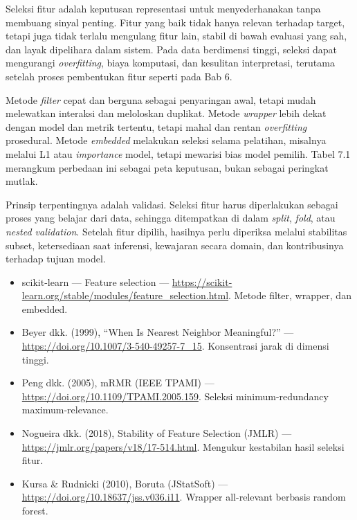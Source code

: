 \begin{sintesis}

Seleksi fitur adalah keputusan representasi untuk menyederhanakan tanpa membuang sinyal penting. Fitur yang baik tidak hanya relevan terhadap target, tetapi juga tidak terlalu mengulang fitur lain, stabil di bawah evaluasi yang sah, dan layak dipelihara dalam sistem. Pada data berdimensi tinggi, seleksi dapat mengurangi \emph{overfitting}, biaya komputasi, dan kesulitan interpretasi, terutama setelah proses pembentukan fitur seperti pada Bab 6.

Metode \emph{filter} cepat dan berguna sebagai penyaringan awal, tetapi mudah melewatkan interaksi dan meloloskan duplikat. Metode \emph{wrapper} lebih dekat dengan model dan metrik tertentu, tetapi mahal dan rentan \emph{overfitting} prosedural. Metode \emph{embedded} melakukan seleksi selama pelatihan, misalnya melalui L1 atau \emph{importance} model, tetapi mewarisi bias model pemilih. Tabel 7.1 merangkum perbedaan ini sebagai peta keputusan, bukan sebagai peringkat mutlak.

Prinsip terpentingnya adalah validasi. Seleksi fitur harus diperlakukan sebagai proses yang belajar dari data, sehingga ditempatkan di dalam \emph{split}, \emph{fold}, atau \emph{nested validation}. Setelah fitur dipilih, hasilnya perlu diperiksa melalui stabilitas subset, ketersediaan saat inferensi, kewajaran secara domain, dan kontribusinya terhadap tujuan model.

\end{sintesis}

\begin{bacaan}

\begin{itemize}
\tightlist
\item
  scikit-learn --- Feature selection --- \url{https://scikit-learn.org/stable/modules/feature_selection.html}. Metode filter, wrapper, dan embedded.
\item
  Beyer dkk. (1999), ``When Is Nearest Neighbor Meaningful?'' --- \url{https://doi.org/10.1007/3-540-49257-7_15}. Konsentrasi jarak di dimensi tinggi.
\item
  Peng dkk. (2005), mRMR (IEEE TPAMI) --- \url{https://doi.org/10.1109/TPAMI.2005.159}. Seleksi minimum-redundancy maximum-relevance.
\item
  Nogueira dkk. (2018), Stability of Feature Selection (JMLR) --- \url{https://jmlr.org/papers/v18/17-514.html}. Mengukur kestabilan hasil seleksi fitur.
\item
  Kursa \& Rudnicki (2010), Boruta (JStatSoft) --- \url{https://doi.org/10.18637/jss.v036.i11}. Wrapper all-relevant berbasis random forest.
\end{itemize}

\end{bacaan}

